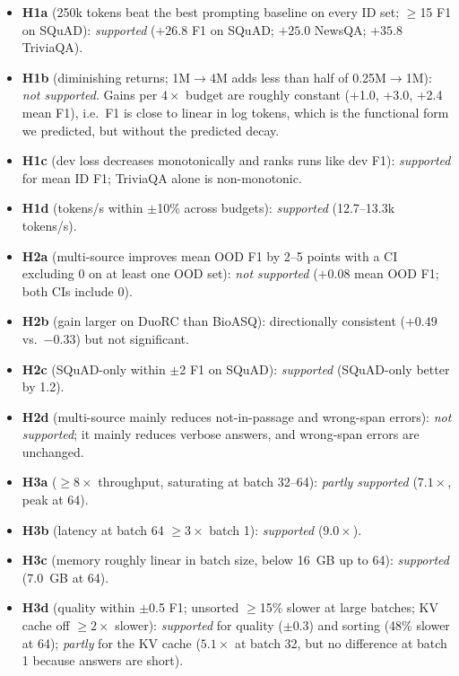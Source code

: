 \documentclass{article}
\begin{document}
\begin{itemize}
  \item \textbf{H1a} (250k tokens beat the best prompting baseline on every ID set; $\geq$15 F1 on SQuAD):
  \emph{supported} ($+26.8$ F1 on SQuAD; $+25.0$ NewsQA; $+35.8$ TriviaQA).
  \item \textbf{H1b} (diminishing returns; 1M$\rightarrow$4M adds less than half of 0.25M$\rightarrow$1M):
  \emph{not supported}. Gains per $4\times$ budget are roughly constant (+1.0, +3.0, +2.4 mean F1), i.e.\ F1 is
  close to linear in log tokens, which is the functional form we predicted, but without the predicted decay.
  \item \textbf{H1c} (dev loss decreases monotonically and ranks runs like dev F1): \emph{supported} for mean ID F1;
  TriviaQA alone is non-monotonic.
  \item \textbf{H1d} (tokens/s within $\pm$10\% across budgets): \emph{supported} (12.7--13.3k tokens/s).
  \item \textbf{H2a} (multi-source improves mean OOD F1 by 2--5 points with a CI excluding 0 on at least one OOD set):
  \emph{not supported} ($+0.08$ mean OOD F1; both CIs include 0).
  \item \textbf{H2b} (gain larger on DuoRC than BioASQ): directionally consistent ($+0.49$ vs.\ $-0.33$) but not significant.
  \item \textbf{H2c} (SQuAD-only within $\pm$2 F1 on SQuAD): \emph{supported} (SQuAD-only better by 1.2).
  \item \textbf{H2d} (multi-source mainly reduces not-in-passage and wrong-span errors): \emph{not supported}; it
  mainly reduces verbose answers, and wrong-span errors are unchanged.
  \item \textbf{H3a} ($\geq 8\times$ throughput, saturating at batch 32--64): \emph{partly supported} ($7.1\times$, peak at 64).
  \item \textbf{H3b} (latency at batch 64 $\geq 3\times$ batch 1): \emph{supported} ($9.0\times$).
  \item \textbf{H3c} (memory roughly linear in batch size, below 16~GB up to 64): \emph{supported} (7.0~GB at 64).
  \item \textbf{H3d} (quality within $\pm$0.5 F1; unsorted $\geq$15\% slower at large batches; KV cache off $\geq 2\times$
  slower): \emph{supported} for quality ($\pm$0.3) and sorting (48\% slower at 64); \emph{partly} for the KV cache
  ($5.1\times$ at batch 32, but no difference at batch 1 because answers are short).
\end{itemize}
\end{document}
